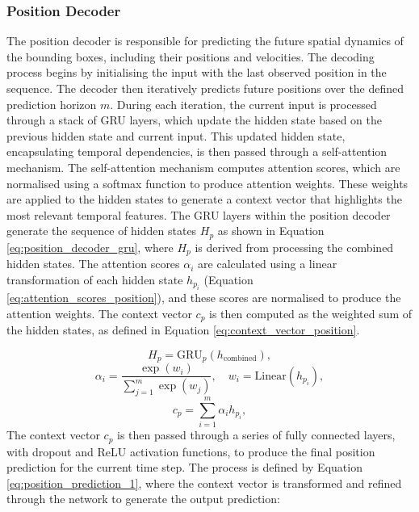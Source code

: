 \documentclass[12pt,oneside]{book} %
\begin{document}
\subsubsection*{Position Decoder}
\noindent The position decoder is responsible for predicting the future spatial dynamics
of the bounding boxes, including their positions and velocities. The decoding
process begins by initialising the input with the last observed position in the
sequence. The decoder then iteratively predicts future positions over the
defined prediction horizon \(m\). During each iteration, the current input is
processed through a stack of GRU layers, which update the hidden state based on
the previous hidden state and current input. This updated hidden state,
encapsulating temporal dependencies, is then passed through a self-attention
mechanism. The self-attention mechanism computes attention scores, which are
normalised using a softmax function to produce attention weights. These weights
are applied to the hidden states to generate a context vector that highlights
the most relevant temporal features. The GRU layers within the position decoder
generate the sequence of hidden states \(H_p\) as shown in Equation
\eqref{eq:position_decoder_gru}, where \(H_p\) is derived from processing the
combined hidden states. The attention scores \(\alpha_i\) are calculated using
a linear transformation of each hidden state \(h_{p_i}\) (Equation
\eqref{eq:attention_scores_position}), and these scores are normalised to
produce the attention weights. The context vector \(c_p\) is then computed as
the weighted sum of the hidden states, as defined in Equation
\eqref{eq:context_vector_position}.

\begin{equation}
    H_p = \text{GRU}_p(h_{\text{combined}}), \label{eq:position_decoder_gru}
\end{equation}
\begin{equation}
    \alpha_i = \frac{\exp(w_i)}{\sum_{j=1}^{m}\exp(w_j)}, \quad w_i = \text{Linear}(h_{p_i}), \label{eq:attention_scores_position}
\end{equation}
\begin{equation}
    c_p = \sum_{i=1}^{m} \alpha_i h_{p_i}, \label{eq:context_vector_position}
\end{equation}
The context vector \(c_p\) is then passed through a series of fully connected
layers, with dropout and ReLU activation functions, to produce the final
position prediction for the current time step. The process is defined by
Equation \eqref{eq:position_prediction_1}, where the context vector is
transformed and refined through the network to generate the output prediction:
\end{document}
